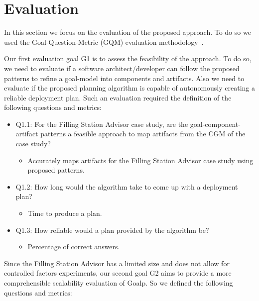 \section{Evaluation}
\label{sec:evaluation}

In this section we focus on the evaluation of the proposed approach.
To do so we used the Goal-Question-Metric (GQM) evaluation methodology~\cite{basili_goal_1994}.

Our first evaluation goal G1 is to assess the feasibility of the approach. To do so, we need to evaluate if a software architect/developer can follow the proposed patterns to refine a goal-model into components and artifacts. Also we need to evaluate if the proposed planning algorithm is capable of autonomously creating a reliable deployment plan.
Such an evaluation required the definition of the following questions and metrics:

\begin{itemize}
  \item Q1.1: For the Filling Station Advisor case study, are the goal-component-artifact patterns a feasible approach to map artifacts from the CGM of the case study?
  \begin{itemize}
    \item Accurately maps artifacts for the Filling Station Advisor case study using proposed patterns.
  \end{itemize}

  \item Q1.2: How long would the algorithm take to come up with a deployment plan?
  \begin{itemize}
    \item Time to produce a plan.
  \end{itemize}

  \item Q1.3: How reliable would a plan provided
  by the algorithm be?
  \begin{itemize}
    \item Percentage of correct answers.
  \end{itemize}

\end{itemize}

Since the Filling Station Advisor has a limited size and does not allow for controlled factors experiments, our second goal G2 aims to provide a more comprehensible scalability evaluation of Goalp. So we defined the following questions and metrics:

